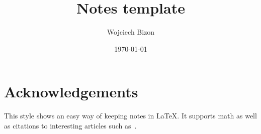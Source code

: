 \documentclass[a4paper,12pt]{article}
\title{Notes template}
\author{Wojciech Bizon}
\date{\today}
\numberwithin{equation}{section}
\begin{document}
\pagestyle{empty}


\maketitle


{
  \hypersetup{linkcolor=black}
  \tableofcontents
}
\clearpage


\pagestyle{plain}
\allowdisplaybreaks

%

%

%

\section*{Acknowledgements}
%
This style shows an easy way of keeping notes in \LaTeX. It supports
math as well as citations to interesting articles such as~\cite{Behring:2019oci}.

\appendix


{}
\end{document}
